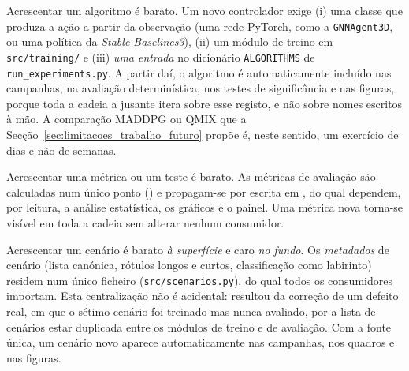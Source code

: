 \documentclass[12pt,reqno, twoside]{amsbook}
\makeatletter
\def\paragraph{\@startsection{paragraph}{4}%
  \z@\z@{-\fontdimen2\font}%
  {\normalfont\bfseries}}
\theoremstyle{plain}
\numberwithin{equation}{chapter}
\numberwithin{section}{chapter}
\numberwithin{table}{chapter}
\numberwithin{figure}{chapter}
\makeatother
\begin{document}
\paragraph{Acrescentar um algoritmo é barato.} Um novo controlador exige (i) uma classe que produza a ação a partir da observação (uma rede PyTorch, como a \texttt{GNNAgent3D}, ou uma política da \textit{Stable-Baselines3}), (ii) um módulo de treino em \texttt{src/training/} e (iii) \emph{uma entrada} no dicionário \texttt{ALGORITHMS} de \texttt{run\_experiments.py}. A partir daí, o algoritmo é automaticamente incluído nas campanhas, na avaliação determinística, nos testes de significância e nas figuras, porque toda a cadeia a jusante itera sobre esse registo, e não sobre nomes escritos à mão. A comparação MADDPG ou QMIX que a Secção~\ref{sec:limitacoes_trabalho_futuro} propõe é, neste sentido, um exercício de dias e não de semanas.

\paragraph{Acrescentar uma métrica ou um teste é barato.} As métricas de avaliação são calculadas num único ponto () e propagam-se por escrita em , do qual dependem, por leitura, a análise estatística, os gráficos e o painel. Uma métrica nova torna-se visível em toda a cadeia sem alterar nenhum consumidor.

\paragraph{Acrescentar um cenário é barato \emph{à superfície} e caro \emph{no fundo}.} Os \emph{metadados} de cenário (lista canónica, rótulos longos e curtos, classificação como labirinto) residem num único ficheiro (\texttt{src/scenarios.py}), do qual todos os consumidores importam. Esta centralização não é acidental: resultou da correção de um defeito real, em que o sétimo cenário foi treinado mas nunca avaliado, por a lista de cenários estar duplicada entre os módulos de treino e de avaliação. Com a fonte única, um cenário novo aparece automaticamente nas campanhas, nos quadros e nas figuras.
\end{document}
